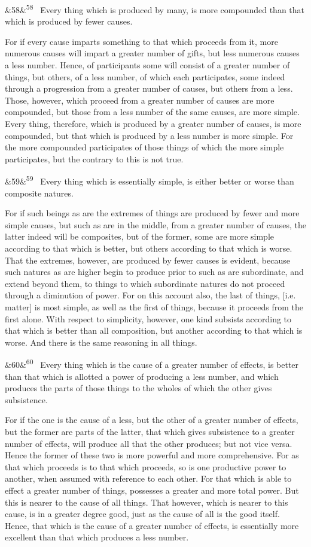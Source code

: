 \documentclass[12pt]{article}
\newcommand{\para}[1][]{\par\noindent\ifx&#1&\else\textsuperscript{\footnotesize #1}~\fi}
\begin{document}
\para[58] Every thing which is produced by many, is more compounded than that which is produced by fewer causes.

For if every cause imparts something to that which proceeds from it, more numerous causes will impart a greater number of gifts, but less numerous causes a less number. Hence, of participants some will consist of a greater number of things, but others, of a less number, of which each participates, some indeed through a progression from a greater number of causes, but others from a less. Those, however, which proceed from a greater number of causes are more compounded, but those from a less number of the same causes, are more simple. Every thing, therefore, which is produced by a greater number of causes, is more compounded, but that which is produced by a less number is more simple. For the more compounded participates of those things of which the more simple participates, but the contrary to this is not true.

\para[59] Every thing which is essentially simple, is either better or worse than composite natures.

For if such beings as are the extremes of things are produced by fewer and more simple causes, but such as are in the middle, from a greater number of causes, the latter indeed will be composites, but of the former, some are more simple according to that which is better, but others according to that which is worse. That the extremes, however, are produced by fewer causes is evident, because such natures as are higher begin to produce prior to such as are subordinate, and extend beyond them, to things to which subordinate natures do not proceed through a diminution of power. For on this account also, the last of things, [i.e. matter] is most simple, as well as the first of things, because it proceeds from the first alone. With respect to simplicity, however, one kind subsists according to that which is better than all composition, but another according to that which is worse. And there is the same reasoning in all things.

\para[60] Every thing which is the cause of a greater number of effects, is better than that which is allotted a power of producing a less number, and which produces the parts of those things to the wholes of which the other gives subsistence.

For if the one is the cause of a less, but the other of a greater number of effects, but the former are parts of the latter, that which gives subsistence to a greater number of effects, will produce all that the other produces; but not vice versa. Hence the former of these two is more powerful and more comprehensive. For as that which proceeds is to that which proceeds, so is one productive power to another, when assumed with reference to each other. For that which is able to effect a greater number of things, possesses a greater and more total power. But this is nearer to the cause of all things. That however, which is nearer to this cause, is in a greater degree good, just as the cause of all is the good itself. Hence, that which is the cause of a greater number of effects, is essentially more excellent than that which produces a less number.
\end{document}
